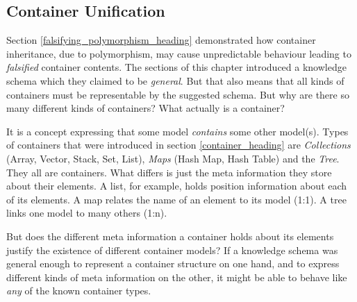 %
%
%
%
%
%
%

\subsection{Container Unification}
\label{container_unification_heading}

Section \ref{falsifying_polymorphism_heading} demonstrated how container
inheritance, due to polymorphism, may cause unpredictable behaviour leading to
\emph{falsified} container contents. The sections of this chapter introduced a
knowledge schema which they claimed to be \emph{general}. But that also means
that all kinds of containers must be representable by the suggested schema. But
why are there so many different kinds of containers? What actually is a
container?

It is a concept expressing that some model \emph{contains} some other model(s).
Types of containers that were introduced in section \ref{container_heading} are
\emph{Collections} (Array, Vector, Stack, Set, List), \emph{Maps} (Hash Map,
Hash Table) and the \emph{Tree}. They all are containers. What differs is just
the meta information they store about their elements. A list, for example,
holds position information about each of its elements. A map relates the name
of an element to its model (1:1). A tree links one model to many others (1:n).

But does the different meta information a container holds about its elements
justify the existence of different container models? If a knowledge schema was
general enough to represent a container structure on one hand, and to express
different kinds of meta information on the other, it might be able to behave
like \emph{any} of the known container types.

